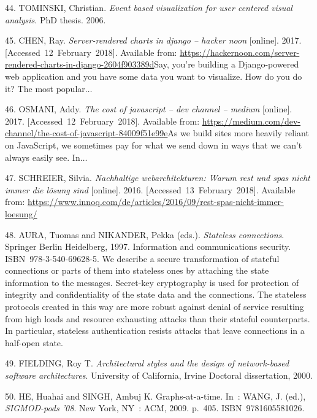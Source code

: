 \documentclass[american,a4paper,oneside,,tablecaptionabove]{scrbook}
\begin{document}
\hypertarget{ref-Tominski.2006}{}
44. TOMINSKI, Christian. \emph{Event based visualization for user
centered visual analysis}. PhD thesis. 2006.

\hypertarget{ref-Chen.2017}{}
45. CHEN, Ray. \emph{Server-rendered charts in django -- hacker noon}
{[}online{]}. 2017. {[}Accessed~12~February~2018{]}. Available from:
\url{https://hackernoon.com/server-rendered-charts-in-django-2604f903389d}Say,
you're building a Django-powered web application and you have some data
you want to visualize. How do you do it? The most popular\(\ldots\)

\hypertarget{ref-Osmani.2017}{}
46. OSMANI, Addy. \emph{The cost of javascript -- dev channel -- medium}
{[}online{]}. 2017. {[}Accessed~12~February~2018{]}. Available from:
\url{https://medium.com/dev-channel/the-cost-of-javascript-84009f51e99e}As
we build sites more heavily reliant on JavaScript, we sometimes pay for
what we send down in ways that we can't always easily see. In\(\ldots\)

\hypertarget{ref-Schreier.2016}{}
47. SCHREIER, Silvia. \emph{Nachhaltige webarchitekturen: Warum rest und
spas nicht immer die lösung sind} {[}online{]}. 2016.
{[}Accessed~13~February~2018{]}. Available from:
\url{https://www.innoq.com/de/articles/2016/09/rest-spas-nicht-immer-loesung/}

\hypertarget{ref-Aura.1997}{}
48. AURA, Tuomas and NIKANDER, Pekka (eds.). \emph{Stateless
connections}. Springer Berlin Heidelberg, 1997. Information and
communications security. ISBN~978-3-540-69628-5. We describe a secure
transformation of stateful connections or parts of them into stateless
ones by attaching the state information to the messages. Secret-key
cryptography is used for protection of integrity and confidentiality of
the state data and the connections. The stateless protocols created in
this way are more robust against denial of service resulting from high
loads and resource exhausting attacks than their stateful counterparts.
In particular, stateless authentication resists attacks that leave
connections in a half-open state.

\hypertarget{ref-Fielding.2000}{}
49. FIELDING, Roy T. \emph{Architectural styles and the design of
network-based software architectures}. University of California, Irvine
Doctoral dissertation, 2000.

\hypertarget{ref-He.2009}{}
50. HE, Huahai and SINGH, Ambuj K. Graphs-at-a-time. In~: WANG, J.
(ed.), \emph{SIGMOD-pods '08}. New York, NY~: ACM, 2009. p.~405.
ISBN~9781605581026.
\end{document}
